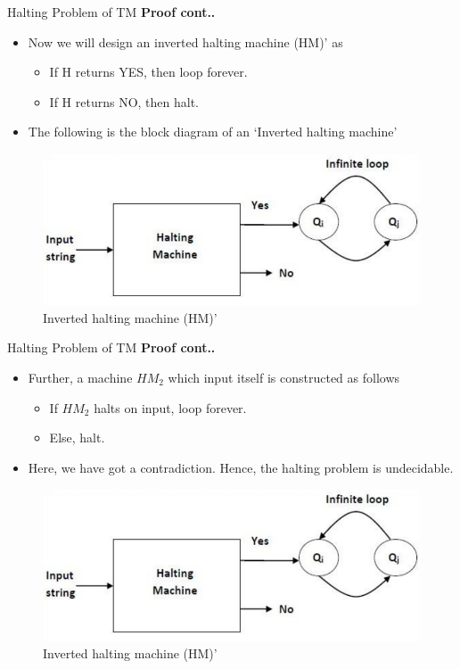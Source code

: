 \documentclass{beamer}
\begin{document}
\begin{frame}{Halting Problem of TM}
	\textbf{Proof cont..}
	\begin{itemize}
		\item Now we will design an inverted halting machine (HM)’ as
		\begin{itemize}
			\item If H returns YES, then loop forever.
			\item If H returns NO, then halt.
		\end{itemize}
	\item The following is the block diagram of an ‘Inverted halting machine’
	\end{itemize}
	\begin{figure}
		\includegraphics[scale=.5]{img5/m27}
		\caption{Inverted halting machine (HM)’}
	\end{figure}
\end{frame}
\begin{frame}{Halting Problem of TM}
	\textbf{Proof cont..}
	\begin{itemize}
		\item Further, a machine $HM_2$ which input itself is
		constructed as follows
		\begin{itemize}
			\item If $HM_2$ halts on input, loop forever.
			\item Else, halt.
		\end{itemize}
		\item Here, we have got a contradiction. Hence, the
		halting problem is undecidable.
	\end{itemize}
	\begin{figure}
		\includegraphics[scale=.5]{img5/m27}
		\caption{Inverted halting machine (HM)’}
	\end{figure}
\end{frame}
\end{document}
